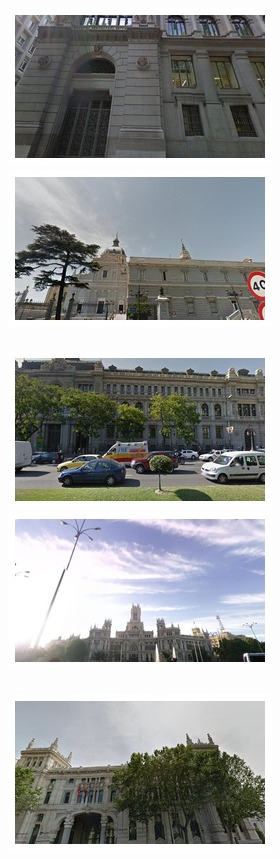 \begin{figure}
\begin{minipage}{\linewidth}
\begin{minipage}{0.3\linewidth}
      \includegraphics[width=0.49\linewidth]{imgs/arch/mosaicsS1/mosaic0002.jpg}
      \includegraphics[width=0.49\linewidth]{imgs/arch/mosaicsS1/mosaic0006.jpg}
      \\ \vspace{-3mm} \\
      \includegraphics[width=0.49\linewidth]{imgs/arch/mosaicsS1/mosaic0009.jpg}
      \includegraphics[width=0.49\linewidth]{imgs/arch/mosaicsS1/mosaic0018.jpg}
      \\ \vspace{-3mm} \\
      \includegraphics[width=0.49\linewidth]{imgs/arch/mosaicsS1/mosaic0021.jpg}

\end{minipage}
\end{minipage}
\end{figure}
